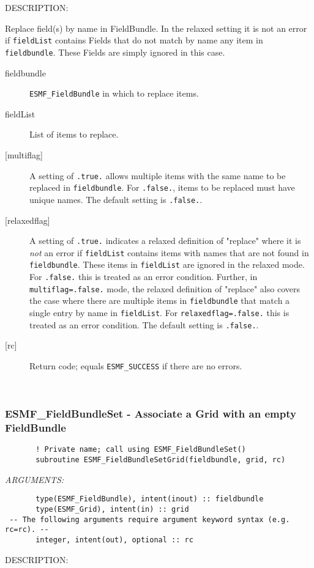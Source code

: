 {\sf DESCRIPTION:\\ }


   Replace field(s) by name in FieldBundle. In the relaxed setting it is not
   an error if {\tt fieldList} contains Fields that do not match by name any
   item in {\tt fieldbundle}. These Fields are simply ignored in this case.
  
   \begin{description}
   \item [fieldbundle]
   {\tt ESMF\_FieldBundle} in which to replace items.
   \item [fieldList]
   List of items to replace.
   \item [{[multiflag]}]
   A setting of {\tt .true.} allows multiple items with the same name
   to be replaced in {\tt fieldbundle}. For {\tt .false.}, items to be
   replaced must have unique names. The default setting is {\tt .false.}.
   \item [{[relaxedflag]}]
   A setting of {\tt .true.} indicates a relaxed definition of "replace"
   where it is {\em not} an error if {\tt fieldList} contains items with
   names that are not found in {\tt fieldbundle}. These items in
   {\tt fieldList} are ignored in the relaxed mode. For {\tt .false.} this
   is treated as an error condition.
   Further, in {\tt multiflag=.false.} mode, the relaxed definition of
   "replace" also covers the case where there are multiple items in
   {\tt fieldbundle} that match a single entry by name in {\tt fieldList}.
   For {\tt relaxedflag=.false.} this is treated as an error condition.
   The default setting is {\tt .false.}.
   \item [{[rc]}]
   Return code; equals {\tt ESMF\_SUCCESS} if there are no errors.
   \end{description}
   
 
\mbox{}\hrulefill\ 
 
\subsubsection [ESMF\_FieldBundleSet] {ESMF\_FieldBundleSet - Associate a Grid with an empty FieldBundle}


  
\begin{verbatim}       ! Private name; call using ESMF_FieldBundleSet()
       subroutine ESMF_FieldBundleSetGrid(fieldbundle, grid, rc)\end{verbatim}{\em ARGUMENTS:}
\begin{verbatim}       type(ESMF_FieldBundle), intent(inout) :: fieldbundle
       type(ESMF_Grid), intent(in) :: grid
 -- The following arguments require argument keyword syntax (e.g. rc=rc). --
       integer, intent(out), optional :: rc\end{verbatim}
{\sf DESCRIPTION:\\ }


